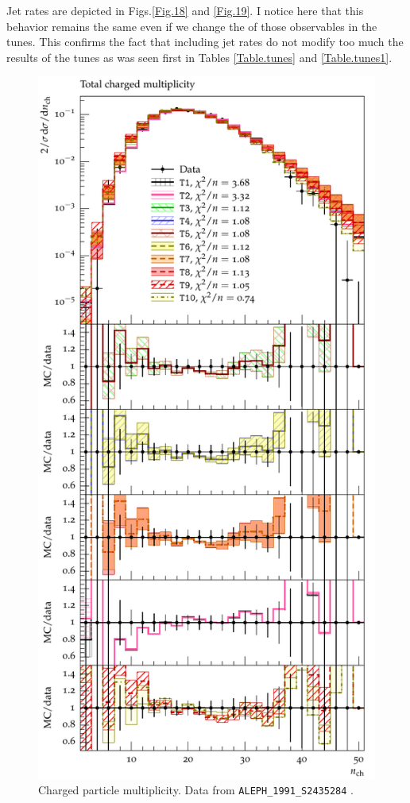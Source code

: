 \documentclass[aps,preprint,floatfix,nofootinbib,showpacs]{revtex4-1}
\begin{document}
Jet rates are depicted in Figs.\ref{Fig.18} and \ref{Fig.19}. I notice here that this behavior
remains the same even if we change the of those observables in the tunes.
This confirms the fact that including jet rates do not modify too much the 
results of the tunes as was seen first in Tables \ref{Table.tunes} and 
\ref{Table.tunes1}.

\begin{figure}[!t]
 \centering
 \includegraphics[width=0.47\linewidth]{Figures/Nch/ALEPH_1991_S2435284_d01-x01-y01.pdf}
 \caption{Charged particle multiplicity. Data from \texttt{ALEPH\_1991\_S2435284} \cite{Decamp:1991uz}.}
 \label{Fig.17}
\end{figure}
\end{document}
